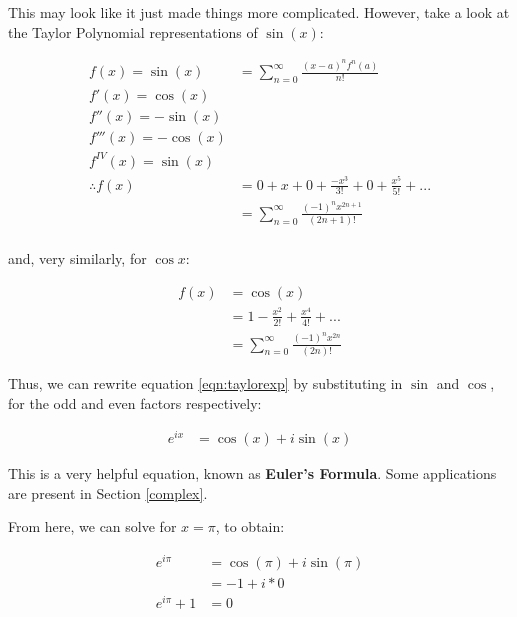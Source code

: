 \documentclass[12pt]{article}
\begin{document}
This may look like it just made things more complicated. However, take a look at the Taylor Polynomial representations of $\sin(x)$:

\begin{equation}
    \begin{split}
        f(x) = \sin(x) &= \sum_{n=0}^{\infty} \frac{(x-a)^n f^n(a)}{n!}\\
        f'(x) = \cos(x)\\
        f''(x) = -\sin(x)\\
        f'''(x) = -\cos(x)\\
        f^{IV}(x) = \sin(x)\\
        \therefore f(x) &= 0 + x + 0 + \frac{-x^3}{3!} + 0 + \frac{x^5}{5!} + ...\\
        &= \sum_{n=0}^{\infty}\frac{(-1)^n x^{2n+1}}{(2n+1)!}\\
    \end{split}
\end{equation}

and, very similarly, for $\cos x$:

\begin{equation}
    \begin{split}
        f(x) &= \cos(x) \\
        &= 1 - \frac{x^2}{2!} + \frac{x^4}{4!} + ...\\
        &= \sum_{n=0}^{\infty} \frac{(-1)^n x^{2n}}{(2n)!}
    \end{split}
\end{equation}

Thus, we can rewrite equation \ref{eqn:taylorexp} by substituting in $\sin$ and $\cos$, for the odd and even factors respectively:

\begin{equation}
    \begin{split}
        e^{ix} &= \cos(x) + i\sin(x)
    \end{split}
\end{equation}

This is a very helpful equation, known as \textbf{Euler's Formula}. Some applications are present in Section \ref{complex}.

From here, we can solve for $x=\pi$, to obtain:

\begin{equation}
    \begin{split}
        e^{i\pi} &= \cos(\pi) + i \sin(\pi)\\
        &= -1 + i*0\\
        e^{i\pi}+1 &= 0
    \end{split}
\end{equation}
\end{document}
